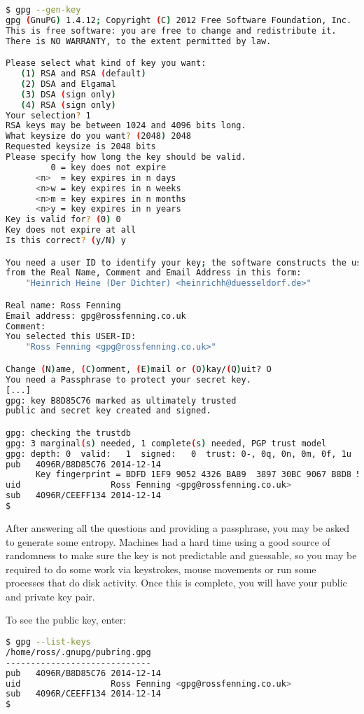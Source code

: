 \documentclass{report}
\begin{document}
\begin{lstlisting}[language=bash]
$ gpg --gen-key
gpg (GnuPG) 1.4.12; Copyright (C) 2012 Free Software Foundation, Inc.
This is free software: you are free to change and redistribute it.
There is NO WARRANTY, to the extent permitted by law.

Please select what kind of key you want:
   (1) RSA and RSA (default)
   (2) DSA and Elgamal
   (3) DSA (sign only)
   (4) RSA (sign only)
Your selection? 1
RSA keys may be between 1024 and 4096 bits long.
What keysize do you want? (2048) 2048
Requested keysize is 2048 bits
Please specify how long the key should be valid.
         0 = key does not expire
      <n>  = key expires in n days
      <n>w = key expires in n weeks
      <n>m = key expires in n months
      <n>y = key expires in n years
Key is valid for? (0) 0
Key does not expire at all
Is this correct? (y/N) y

You need a user ID to identify your key; the software constructs the user ID
from the Real Name, Comment and Email Address in this form:
    "Heinrich Heine (Der Dichter) <heinrichh@duesseldorf.de>"

Real name: Ross Fenning
Email address: gpg@rossfenning.co.uk
Comment:
You selected this USER-ID:
    "Ross Fenning <gpg@rossfenning.co.uk>"

Change (N)ame, (C)omment, (E)mail or (O)kay/(Q)uit? O
You need a Passphrase to protect your secret key.
[...]
gpg: key B8D85C76 marked as ultimately trusted
public and secret key created and signed.

gpg: checking the trustdb
gpg: 3 marginal(s) needed, 1 complete(s) needed, PGP trust model
gpg: depth: 0  valid:   1  signed:   0  trust: 0-, 0q, 0n, 0m, 0f, 1u
pub   4096R/B8D85C76 2014-12-14
      Key fingerprint = BDFD 1EF9 9052 4326 BA89  3897 30BC 9067 B8D8 5C76
uid                  Ross Fenning <gpg@rossfenning.co.uk>
sub   4096R/CEEFF134 2014-12-14
$
\end{lstlisting}

After answering all the questions and providing a passphrase,
you may be asked to generate some entropy.
Machines had a hard time using a good source of randomness to make sure
the key is not predictable and guessable, so you may be required to do
some work via keystrokes, mouse movements or run some processes that
do disk activity. Once this is complete, you will have your public and
private key pair.

To see the public key, enter:

\begin{lstlisting}[language=bash]
$ gpg --list-keys
/home/ross/.gnupg/pubring.gpg
-----------------------------
pub   4096R/B8D85C76 2014-12-14
uid                  Ross Fenning <gpg@rossfenning.co.uk>
sub   4096R/CEEFF134 2014-12-14
$
\end{lstlisting}
\end{document}
